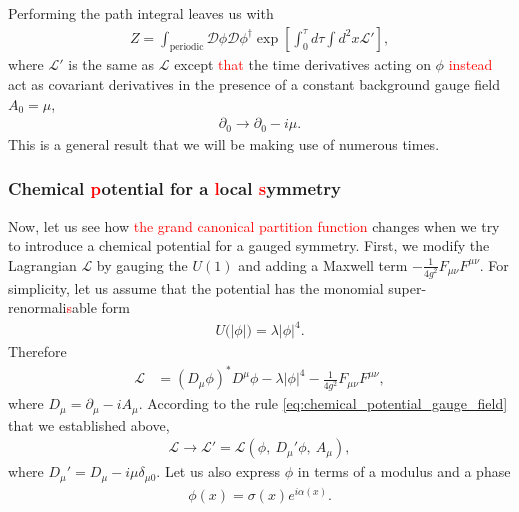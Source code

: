        Performing the path integral leaves us with
        \begin{align}
            Z= \int_{\text{periodic}} \mathcal{D}\phi \mathcal{D}\phi^{\dag} \exp \left[\int_0^{\tau} d\tau \int d^2x \mathcal{L'} \right],
        \end{align}
        where $\mathcal{L'}$ is the same as $\mathcal{L}$ except \textcolor{red}{that} the time derivatives acting on $\phi$ \textcolor{red}{instead} act as covariant derivatives in the presence of a constant background gauge field $A_0=\mu$, \ie
        \begin{align}
            \partial_0 \rightarrow \partial_0 -i \mu. \label{eq:chemical_potential_gauge_field}
        \end{align}
        This is a general result that we will be making use of numerous times.
        \subsubsection*{Chemical \textcolor{red}{p}otential for a \textcolor{red}{l}ocal \textcolor{red}{s}ymmetry}
        Now, let us see how \textcolor{red}{the grand canonical partition function} changes when we try to introduce a chemical potential for a gauged symmetry. First, we modify the Lagrangian $\mathcal{L}$ by gauging the $U(1)$ and adding a Maxwell term $-\frac{1}{4 g^2} F_{\mu \nu} F^{\mu \nu}$. For simplicity, let us assume that the potential has the monomial super-renormali\textcolor{red}{s}able form
        \begin{align}
            U\big(|\phi| \big) = \lambda |\phi|^4.
        \end{align}
        Therefore
        \begin{align}
            \mathcal{L} &=( D_{\mu} \phi)^* D^{\mu} \phi - \lambda |\phi|^4 - \frac{1}{4 g^2}F_{\mu \nu} F^{\mu \nu},
        \end{align}
        where $D_{\mu}= \partial_{\mu} - i A_{\mu}$. According to the rule \ref{eq:chemical_potential_gauge_field} that we established above,
        \begin{align}
            \mathcal{L} \rightarrow \mathcal{L}'= \mathcal{L}\left(\phi,\ D_{\mu}' \phi,\ A_{\mu} \right),
        \end{align}
        where $D_{\mu}' = D_{\mu} - i \mu \delta_{\mu 0}$.
        Let us also express $\phi$ in terms of a modulus and a phase
        \begin{align}
            \phi(x) = \sigma(x) e^{i \alpha(x)}.
        \end{align}

